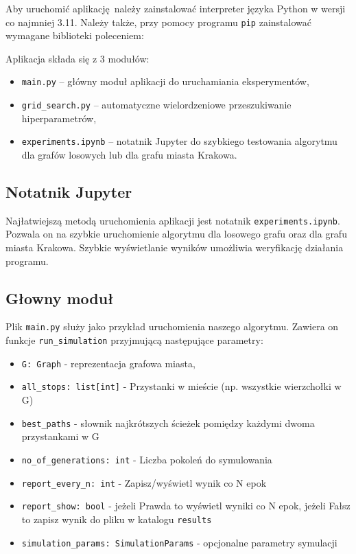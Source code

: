 \documentclass[12pt,a4paper]{article}
\begin{document}
Aby uruchomić aplikację należy zainstalować interpreter języka Python w wersji co najmniej 3.11. Należy także, przy pomocy programu \lstinline|pip| zainstalować wymagane biblioteki poleceniem:


Aplikacja składa się z 3 modułów:
\begin{itemize}
	\item \lstinline|main.py| -- główny moduł aplikacji do uruchamiania eksperymentów,
	\item \lstinline|grid_search.py| -- automatyczne wielordzeniowe przeszukiwanie hiperparametrów,
	\item \lstinline|experiments.ipynb| -- notatnik Jupyter do szybkiego testowania algorytmu dla grafów losowych lub dla grafu miasta Krakowa.
\end{itemize}

\subsection{Notatnik Jupyter}
Najłatwiejszą metodą uruchomienia aplikacji jest notatnik \lstinline|experiments.ipynb|. Pozwala on na szybkie uruchomienie algorytmu dla losowego grafu oraz dla grafu miasta Krakowa. Szybkie wyświetlanie wyników umożliwia weryfikację działania programu.

\subsection{Głowny moduł}
Plik \lstinline|main.py| służy jako przykład uruchomienia naszego algorytmu. Zawiera on funkcje \lstinline|run_simulation| przyjmującą następujące parametry:
\begin{itemize}
	\item \lstinline|G: Graph| - reprezentacja grafowa miasta,
	\item \lstinline|all_stops: list[int]| - Przystanki w mieście (np. wszystkie wierzchołki w G)
	\item \lstinline|best_paths| - słownik najkrótszych ścieżek pomiędzy każdymi dwoma przystankami w G
	\item \lstinline|no_of_generations: int| - Liczba pokoleń do symulowania
	\item \lstinline|report_every_n: int| - Zapisz/wyświetl wynik co N epok
	\item \lstinline|report_show: bool| - jeżeli Prawda to wyświetl wyniki co N epok, jeżeli Fałsz to zapisz wynik do pliku w katalogu \lstinline|results|
	\item \lstinline|simulation_params: SimulationParams| - opcjonalne parametry symulacji
\end{itemize}
\end{document}

